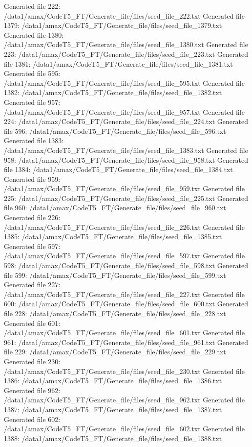 Generated file 222: /data1/amax/CodeT5_FT/Generate_file/files/seed_file_222.txt
Generated file 1379: /data1/amax/CodeT5_FT/Generate_file/files/seed_file_1379.txt
Generated file 1380: /data1/amax/CodeT5_FT/Generate_file/files/seed_file_1380.txt
Generated file 223: /data1/amax/CodeT5_FT/Generate_file/files/seed_file_223.txt
Generated file 1381: /data1/amax/CodeT5_FT/Generate_file/files/seed_file_1381.txt
Generated file 595: /data1/amax/CodeT5_FT/Generate_file/files/seed_file_595.txt
Generated file 1382: /data1/amax/CodeT5_FT/Generate_file/files/seed_file_1382.txt
Generated file 957: /data1/amax/CodeT5_FT/Generate_file/files/seed_file_957.txt
Generated file 224: /data1/amax/CodeT5_FT/Generate_file/files/seed_file_224.txt
Generated file 596: /data1/amax/CodeT5_FT/Generate_file/files/seed_file_596.txt
Generated file 1383: /data1/amax/CodeT5_FT/Generate_file/files/seed_file_1383.txt
Generated file 958: /data1/amax/CodeT5_FT/Generate_file/files/seed_file_958.txt
Generated file 1384: /data1/amax/CodeT5_FT/Generate_file/files/seed_file_1384.txt
Generated file 959: /data1/amax/CodeT5_FT/Generate_file/files/seed_file_959.txt
Generated file 225: /data1/amax/CodeT5_FT/Generate_file/files/seed_file_225.txt
Generated file 960: /data1/amax/CodeT5_FT/Generate_file/files/seed_file_960.txt
Generated file 226: /data1/amax/CodeT5_FT/Generate_file/files/seed_file_226.txt
Generated file 1385: /data1/amax/CodeT5_FT/Generate_file/files/seed_file_1385.txt
Generated file 597: /data1/amax/CodeT5_FT/Generate_file/files/seed_file_597.txt
Generated file 598: /data1/amax/CodeT5_FT/Generate_file/files/seed_file_598.txt
Generated file 599: /data1/amax/CodeT5_FT/Generate_file/files/seed_file_599.txt
Generated file 227: /data1/amax/CodeT5_FT/Generate_file/files/seed_file_227.txt
Generated file 600: /data1/amax/CodeT5_FT/Generate_file/files/seed_file_600.txt
Generated file 228: /data1/amax/CodeT5_FT/Generate_file/files/seed_file_228.txt
Generated file 601: /data1/amax/CodeT5_FT/Generate_file/files/seed_file_601.txt
Generated file 961: /data1/amax/CodeT5_FT/Generate_file/files/seed_file_961.txt
Generated file 229: /data1/amax/CodeT5_FT/Generate_file/files/seed_file_229.txt
Generated file 230: /data1/amax/CodeT5_FT/Generate_file/files/seed_file_230.txt
Generated file 1386: /data1/amax/CodeT5_FT/Generate_file/files/seed_file_1386.txt
Generated file 962: /data1/amax/CodeT5_FT/Generate_file/files/seed_file_962.txt
Generated file 1387: /data1/amax/CodeT5_FT/Generate_file/files/seed_file_1387.txt
Generated file 602: /data1/amax/CodeT5_FT/Generate_file/files/seed_file_602.txt
Generated file 1388: /data1/amax/CodeT5_FT/Generate_file/files/seed_file_1388.txt
